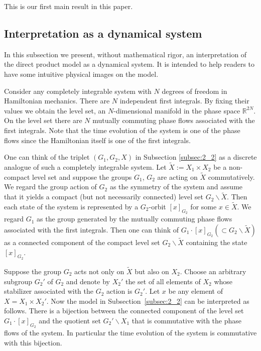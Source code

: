 This is our f\/irst main result in this paper.

\subsection{Interpretation as a dynamical system}\label{subsec:2_3}

In this subsection we present, without mathematical rigor, an interpretation of the direct product model
as a dynamical system.
It is intended to help readers to have some intuitive physical images on the model.


Consider any completely integrable system with $N$ degrees of freedom in Hamiltonian mechanics.
There are $N$ independent f\/irst integrals.
By f\/ixing their values we obtain the level set, an $N$-dimensional manifold in the phase space $\mathbb{R}^{2N}$.
On the level set there are $N$ mutually commuting phase f\/lows associated with the f\/irst integrals.
Note that the time evolution of the system is one of the phase f\/lows since the Hamiltonian itself is one of the f\/irst integrals.


One can think of the triplet $(G_1,G_2,X)$ in Subsection \ref{subsec:2_2} as a discrete analogue of such a completely integrable system.
Let $\tilde{X} := X_1 \times X_2$ be a non-compact level set and suppose
the groups $G_1$, $G_2$ are acting on $\tilde{X}$ commutatively.
We regard the group action of $G_2$ as the symmetry of the system and assume that it yields
a compact (but not necessarily connected) level set $G_2 \backslash \tilde{X}$.
Then each state of the system
is represented by a $G_2$-orbit $[x]_{G_2}$ for some $x \in \tilde{X}$.
We regard $G_1$ as the group generated by the mutually commuting phase f\/lows associated with the f\/irst integrals.
Then one can think of
$G_1 \cdot [x]_{G_2} (\subset G_2 \backslash \tilde{X})$ as a connected component of the compact level set
$G_2 \backslash \tilde{X}$ containing the state $[x]_{G_2}$.

Suppose the group $G_2$ acts not only on $\tilde{X}$ but also on $X_2$.
Choose an arbitrary subgroup $G_2'$ of $G_2$ and denote by $X_2'$ the set of all elements of $X_2$ whose stabilizer
associated with the $G_2$ action is $G_2'$.
Let $x$ be any element of $X = X_1 \times X_2'$.
Now the model in Subsection~\ref{subsec:2_2}
can be interpreted as follows.
There is a bijection between the connected component of the level set
$G_1 \cdot [x]_{G_2}$
and the quotient set $G_2' \backslash X_1$ that is commutative with the phase f\/lows of the system.
In particular the time evolution of the system is commutative with this bijection.

